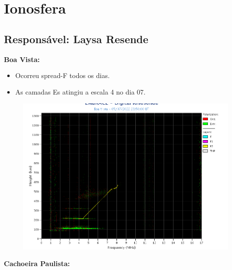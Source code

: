 \documentclass[a4paper, 10pt]{article}
\begin{document}
\section{Ionosfera} 
 \subsection{Responsável: Laysa Resende} 
 
\textbf{Boa Vista: }

 \begin{itemize}
\item Ocorreu spread-F todos os dias.
\item As camadas Es atingiu a escala 4 no dia 07.
\end{itemize}
\begin{figure}[H]
    \centering
    \includegraphics[width=14cm]{./figures//BoaVista.png}
\end{figure}

\textbf{Cachoeira Paulista:}
\end{document}
